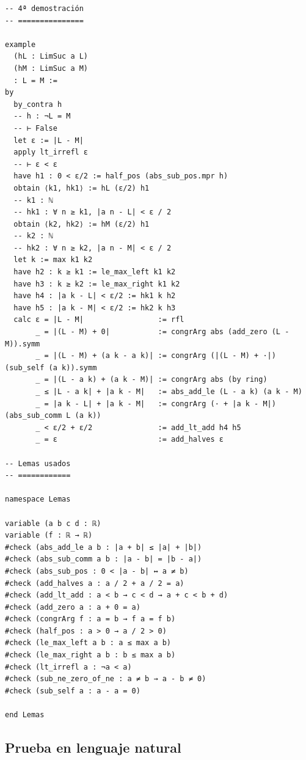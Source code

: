 \begin{verbatim}
-- 4ª demostración
-- ===============

example
  (hL : LimSuc a L)
  (hM : LimSuc a M)
  : L = M :=
by
  by_contra h
  -- h : ¬L = M
  -- ⊢ False
  let ε := |L - M|
  apply lt_irrefl ε
  -- ⊢ ε < ε
  have h1 : 0 < ε/2 := half_pos (abs_sub_pos.mpr h)
  obtain ⟨k1, hk1⟩ := hL (ε/2) h1
  -- k1 : ℕ
  -- hk1 : ∀ n ≥ k1, |a n - L| < ε / 2
  obtain ⟨k2, hk2⟩ := hM (ε/2) h1
  -- k2 : ℕ
  -- hk2 : ∀ n ≥ k2, |a n - M| < ε / 2
  let k := max k1 k2
  have h2 : k ≥ k1 := le_max_left k1 k2
  have h3 : k ≥ k2 := le_max_right k1 k2
  have h4 : |a k - L| < ε/2 := hk1 k h2
  have h5 : |a k - M| < ε/2 := hk2 k h3
  calc ε = |L - M|                 := rfl
       _ = |(L - M) + 0|           := congrArg abs (add_zero (L - M)).symm
       _ = |(L - M) + (a k - a k)| := congrArg (|(L - M) + ·|) (sub_self (a k)).symm
       _ = |(L - a k) + (a k - M)| := congrArg abs (by ring)
       _ ≤ |L - a k| + |a k - M|   := abs_add_le (L - a k) (a k - M)
       _ = |a k - L| + |a k - M|   := congrArg (· + |a k - M|) (abs_sub_comm L (a k))
       _ < ε/2 + ε/2               := add_lt_add h4 h5
       _ = ε                       := add_halves ε

-- Lemas usados
-- ============

namespace Lemas

variable (a b c d : ℝ)
variable (f : ℝ → ℝ)
#check (abs_add_le a b : |a + b| ≤ |a| + |b|)
#check (abs_sub_comm a b : |a - b| = |b - a|)
#check (abs_sub_pos : 0 < |a - b| ↔ a ≠ b)
#check (add_halves a : a / 2 + a / 2 = a)
#check (add_lt_add : a < b → c < d → a + c < b + d)
#check (add_zero a : a + 0 = a)
#check (congrArg f : a = b → f a = f b)
#check (half_pos : a > 0 → a / 2 > 0)
#check (le_max_left a b : a ≤ max a b)
#check (le_max_right a b : b ≤ max a b)
#check (lt_irrefl a : ¬a < a)
#check (sub_ne_zero_of_ne : a ≠ b → a - b ≠ 0)
#check (sub_self a : a - a = 0)

end Lemas
\end{verbatim}

\subsection{Prueba en lenguaje natural}

